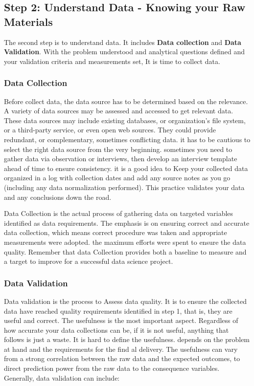 \documentclass[
]{book}
\begin{document}
\hypertarget{step2}{%
\subsection*{Step 2: Understand Data - Knowing your Raw Materials}\label{step2}}


The second step is to understand data. It includes \textbf{Data collection} and \textbf{Data Validation}. With the problem understood and analytical questions defined and your validation criteria and measurements set, It is time to collect data.

\hypertarget{data-collection}{%
\subsubsection*{Data Collection}\label{data-collection}}


Before collect data, the data source has to be determined based on the relevance. A variety of data sources may be assessed and accessed to get relevant data. These data sources may include existing databases, or organization's file system, or a third-party service, or even open web sources. They could provide redundant, or complementary, sometimes conflicting data. it has to be cautious to select the right data source from the very beginning. sometimes you need to gather data via observation or interviews, then develop an interview template ahead of time to ensure consistency. it is a good idea to Keep your collected data organized in a log with collection dates and add any source notes as you go (including any data normalization performed). This practice validates your data and any conclusions down the road.

Data Collection is the actual process of gathering data on targeted variables identified as data requirements. The emphasis is on ensuring correct and accurate data collection, which means correct procedure was taken and appropriate measurements were adopted. the maximum efforts were spent to ensure the data quality. Remember that data Collection provides both a baseline to measure and a target to improve for a successful data science project.

\hypertarget{data-validation}{%
\subsubsection*{Data Validation}\label{data-validation}}


Data validation is the process to Assess data quality. It is to ensure the collected data have reached quality requirements identified in step 1, that is, they are useful and correct. The usefulness is the most important aspect. Regardless of how accurate your data collections can be, if it is not useful, anything that follows is just a waste. It is hard to define the usefulness. depends on the problem at hand and the requirements for the find al delivery. The usefulness can vary from a strong correlation between the raw data and the expected outcomes, to direct prediction power from the raw data to the consequence variables. Generally, data validation can include:
\end{document}
